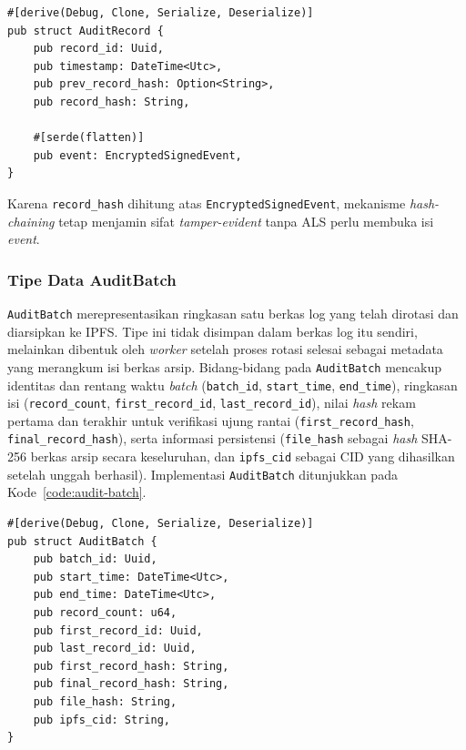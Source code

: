 \begin{listing}[ht]
\caption{Implementasi \texttt{AuditRecord}}
\label{code:audit-record}
\begin{verbatim}
#[derive(Debug, Clone, Serialize, Deserialize)]
pub struct AuditRecord {
    pub record_id: Uuid,
    pub timestamp: DateTime<Utc>,
    pub prev_record_hash: Option<String>,
    pub record_hash: String,
 
    #[serde(flatten)]
    pub event: EncryptedSignedEvent,
}
\end{verbatim}
\end{listing}
 
Karena \texttt{record\_hash} dihitung atas \texttt{EncryptedSignedEvent},
mekanisme \textit{hash-chaining} tetap menjamin sifat \textit{tamper-evident}
tanpa ALS perlu membuka isi \textit{event}.

\subsubsection{Tipe Data AuditBatch}

\texttt{AuditBatch} merepresentasikan ringkasan satu berkas log yang telah
dirotasi dan diarsipkan ke IPFS. Tipe ini tidak disimpan dalam berkas log itu
sendiri, melainkan dibentuk oleh \textit{worker} setelah proses rotasi selesai
sebagai metadata yang merangkum isi berkas arsip. Bidang-bidang pada
\texttt{AuditBatch} mencakup identitas dan rentang waktu \textit{batch}
(\texttt{batch\_id}, \texttt{start\_time}, \texttt{end\_time}), ringkasan isi
(\texttt{record\_count}, \texttt{first\_record\_id}, \texttt{last\_record\_id}),
nilai \textit{hash} rekam pertama dan terakhir untuk verifikasi ujung rantai
(\texttt{first\_record\_hash}, \texttt{final\_record\_hash}), serta informasi
persistensi (\texttt{file\_hash} sebagai \textit{hash} SHA-256 berkas arsip
secara keseluruhan, dan \texttt{ipfs\_cid} sebagai CID yang dihasilkan setelah
unggah berhasil). Implementasi \texttt{AuditBatch} ditunjukkan pada
Kode~\ref{code:audit-batch}.

\begin{verbatim}
#[derive(Debug, Clone, Serialize, Deserialize)]
pub struct AuditBatch {
    pub batch_id: Uuid,
    pub start_time: DateTime<Utc>,
    pub end_time: DateTime<Utc>,
    pub record_count: u64,
    pub first_record_id: Uuid,
    pub last_record_id: Uuid,
    pub first_record_hash: String,
    pub final_record_hash: String,
    pub file_hash: String,
    pub ipfs_cid: String,
}
\end{verbatim}


